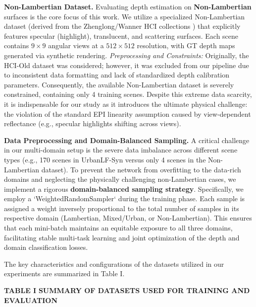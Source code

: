 \textbf{Non-Lambertian Dataset.} Evaluating depth estimation on \textbf{Non-Lambertian} surfaces is the core focus of this work. We utilize a specialized Non-Lambertian dataset (derived from the Zhenglong/Wanner HCI collections ) that explicitly features specular (highlight), translucent, and scattering surfaces. Each scene contains $9 \times 9$ angular views at a $512 \times 512$ resolution, with GT depth maps generated via synthetic rendering. \textit{Preprocessing and Constraints:} Originally, the HCI-Old dataset was considered; however, it was excluded from our pipeline due to inconsistent data formatting and lack of standardized depth calibration parameters. Consequently, the available Non-Lambertian dataset is severely constrained, containing only 4 training scenes. Despite this extreme data scarcity, it is indispensable for our study as it introduces the ultimate physical challenge: the violation of the standard EPI linearity assumption caused by view-dependent reflectance (e.g., specular highlights shifting across views).

\textbf{Data Preprocessing and Domain-Balanced Sampling.} 
A critical challenge in our multi-domain setup is the severe data imbalance across different scene types (e.g., 170 scenes in UrbanLF-Syn versus only 4 scenes in the Non-Lambertian dataset). To prevent the network from overfitting to the data-rich domains and neglecting the physically challenging non-Lambertian cases, we implement a rigorous \textbf{domain-balanced sampling strategy}. Specifically, we employ a `WeightedRandomSampler` during the training phase. Each sample is assigned a weight inversely proportional to the total number of samples in its respective domain (Lambertian, Mixed/Urban, or Non-Lambertian). This ensures that each mini-batch maintains an equitable exposure to all three domains, facilitating stable multi-task learning and joint optimization of the depth and domain classification losses.

The key characteristics and configurations of the datasets utilized in our experiments are summarized in Table I.

\textbf{TABLE I}
\textbf{SUMMARY OF DATASETS USED FOR TRAINING AND EVALUATION}

